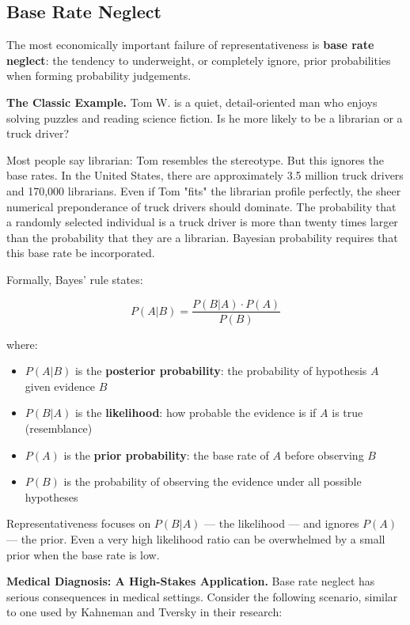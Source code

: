 \documentclass[12pt, letterpaper]{article}
\begin{document}
\subsection{Base Rate Neglect}


The most economically important failure of representativeness is \textbf{base rate neglect}: the tendency to underweight, or completely ignore, prior probabilities when forming probability judgements.

\textbf{The Classic Example.} Tom W. is a quiet, detail-oriented man who enjoys solving puzzles and reading science fiction. Is he more likely to be a librarian or a truck driver?

Most people say librarian: Tom resembles the stereotype. But this ignores the base rates. In the United States, there are approximately 3.5 million truck drivers and 170,000 librarians. Even if Tom "fits" the librarian profile perfectly, the sheer numerical preponderance of truck drivers should dominate. The probability that a randomly selected individual is a truck driver is more than twenty times larger than the probability that they are a librarian. Bayesian probability requires that this base rate be incorporated.

Formally, Bayes' rule states:

$$P(A|B) = \frac{P(B|A) \cdot P(A)}{P(B)}$$

where:
\begin{itemize}
\item $P(A|B)$ is the \textbf{posterior probability}: the probability of hypothesis $A$ given evidence $B$
\item $P(B|A)$ is the \textbf{likelihood}: how probable the evidence is if $A$ is true (resemblance)
\item $P(A)$ is the \textbf{prior probability}: the base rate of $A$ before observing $B$
\item $P(B)$ is the probability of observing the evidence under all possible hypotheses
\end{itemize}

Representativeness focuses on $P(B|A)$ --- the likelihood --- and ignores $P(A)$ --- the prior. Even a very high likelihood ratio can be overwhelmed by a small prior when the base rate is low.

\textbf{Medical Diagnosis: A High-Stakes Application.} Base rate neglect has serious consequences in medical settings. Consider the following scenario, similar to one used by Kahneman and Tversky in their research:
\end{document}
